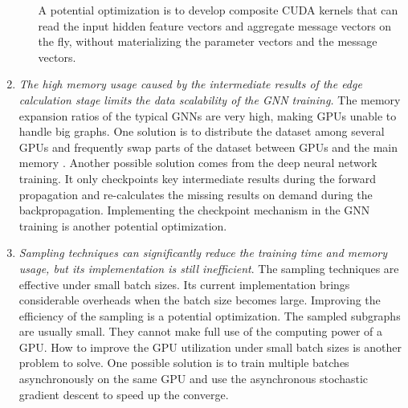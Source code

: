 \begin{enumerate}
\begin{itemize}
                    A potential optimization is to develop composite CUDA kernels that can read the input hidden feature vectors and aggregate message vectors on the fly, without materializing the parameter vectors and the message vectors.          \end{itemize}
    \item \emph{The high memory usage caused by the intermediate results of the edge calculation stage limits the data scalability of the GNN training.}
          The memory expansion ratios of the typical GNNs are very high, making GPUs unable to handle big graphs.
          One solution is to distribute the dataset among several GPUs and frequently swap parts of the dataset between GPUs and the main memory \cite{ma2019_neugraph}.
          Another possible solution \cite{chen2016_training_deep} comes from the deep neural network training.
          It only checkpoints key intermediate results during the forward propagation and re-calculates the missing results on demand during the backpropagation.
          Implementing the checkpoint mechanism in the GNN training is another potential optimization.

    \item \emph{Sampling techniques can significantly reduce the training time and memory usage, but its implementation is still inefficient}.
          The sampling techniques are effective under small batch sizes.
          Its current implementation brings considerable overheads when the batch size becomes large.
          Improving the efficiency of the sampling is a potential optimization.
          The sampled subgraphs are usually small.
          They cannot make full use of the computing power of a GPU.
          How to improve the GPU utilization under small batch sizes is another problem to solve.
          One possible solution is to train multiple batches asynchronously on the same GPU and use the asynchronous stochastic gradient descent to speed up the converge.

\end{enumerate}
